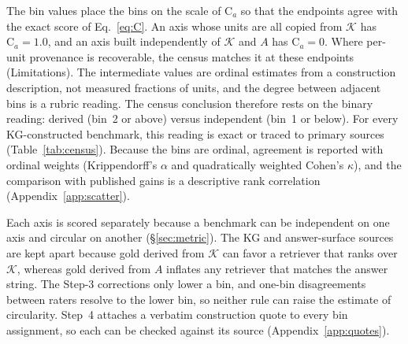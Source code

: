 \documentclass[11pt]{article}
\newcommand{\C}{\mathrm{C}}
\newcommand{\kg}{\mathcal{K}}
\begin{document}
The bin values place the bins on the scale of $\C_a$ so that the endpoints agree with the exact score of Eq.~\eqref{eq:C}. An axis whose units are all copied from $\kg$ has $\C_a=1.0$, and an axis built independently of $\kg$ and $A$ has $\C_a=0$. Where per-unit provenance is recoverable, the census matches it at these endpoints (Limitations). The intermediate values are ordinal estimates from a construction description, not measured fractions of units, and the degree between adjacent bins is a rubric reading. The census conclusion therefore rests on the binary reading: derived (bin~2 or above) versus independent (bin~1 or below). For every KG-constructed benchmark, this reading is exact or traced to primary sources (Table~\ref{tab:census}). Because the bins are ordinal, agreement is reported with ordinal weights (Krippendorff's $\alpha$ and quadratically weighted Cohen's $\kappa$), and the comparison with published gains is a descriptive rank correlation (Appendix~\ref{app:scatter}).

Each axis is scored separately because a benchmark can be independent on one axis and circular on another (\S\ref{sec:metric}). The KG and answer-surface sources are kept apart because gold derived from $\kg$ can favor a retriever that ranks over $\kg$, whereas gold derived from $A$ inflates any retriever that matches the answer string. The Step-3 corrections only lower a bin, and one-bin disagreements between raters resolve to the lower bin, so neither rule can raise the estimate of circularity. Step~4 attaches a verbatim construction quote to every bin assignment, so each can be checked against its source (Appendix~\ref{app:quotes}).
\end{document}

